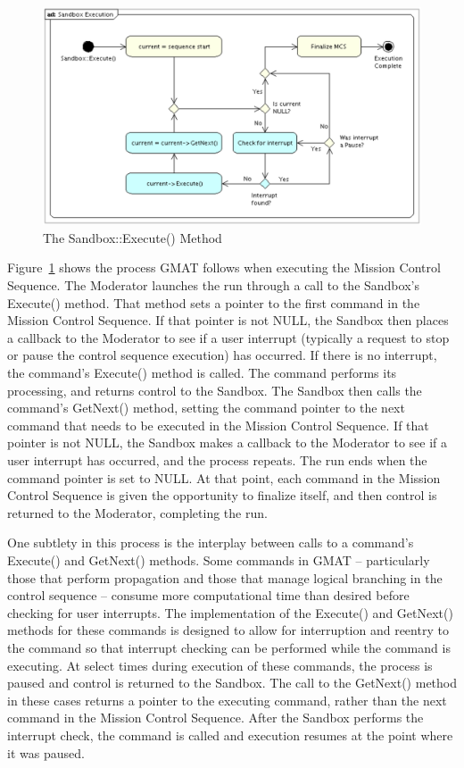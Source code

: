 \begin{figure}[htbp]
\begin{center}
\includegraphics[scale=0.6]{Images/SandboxExecution.eps}
\caption{\label{fig:SandboxExecution}The Sandbox::Execute() Method}
\end{center}
\end{figure}

Figure~\ref{fig:SandboxExecution} shows the process GMAT follows when executing the Mission Control Sequence.  The Moderator launches the run through a call to the Sandbox's Execute() method.  That method sets a pointer to the first command in the Mission Control Sequence.  If that pointer is not
NULL, the Sandbox then places a callback to the Moderator to see if a user interrupt (typically a request to stop or pause the control sequence execution) has occurred.  If there is no interrupt, the command's Execute() method is called.  The command performs its processing, and returns control to the Sandbox.  The Sandbox then calls the command's GetNext() method, setting the command pointer to the next command that needs to be executed in the Mission Control Sequence.  If that pointer is not NULL, the Sandbox makes a callback to the Moderator to see if a user interrupt has occurred, and the process repeats. The run ends when the command pointer is set to NULL.  At that point, each command in the Mission Control Sequence is given the opportunity to finalize itself, and then control is returned to the Moderator, completing the run.

One subtlety in this process is the interplay between calls to a command's Execute() and GetNext() methods.  Some commands in GMAT -- particularly those that perform propagation and those that manage logical branching in the control sequence -- consume more computational time than desired before checking for user interrupts.  The implementation of the Execute() and GetNext() methods for these commands is designed to allow for interruption and reentry to the command so that interrupt checking can be performed while the command is executing.  At select times during execution of these commands, the process is paused and control is returned to the Sandbox.  The call to the GetNext() method in these cases returns a pointer to the executing command, rather than the next command in the Mission Control Sequence.  After the Sandbox performs the interrupt check, the command is called and execution resumes at the point where it was paused.

